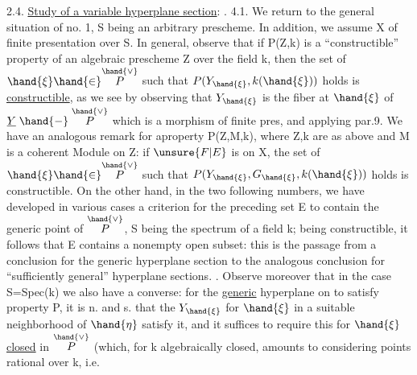 2.4. \uline{Study of a variable hyperplane section}: .
4.1.
We return to the general situation of no. 1, S being an arbitrary
prescheme. In addition, we assume X of finite presentation over S.
In general, observe that if P(Z,k) is a “constructible” property
 of an algebraic prescheme Z over the field k,
then the set of $\hand{\xi} \hand{\in} \overset{\hand{\vee}}{P}$ such that $P(Y_{\hand{\xi}},k(\hand{\xi}))$ holds is \uline{constructible},
as we see by observing that $Y_{\hand{\xi}}$ is the fiber at $\hand{\xi}$ of $\underline{Y} \mathrel{\hand{-}} \overset{\hand{\vee}}{P}$\hand{,} which
is a morphism of finite pres, and applying par.9. We have an
analogous remark for a\hand{|}property P(Z,M,k), where Z,k are as above
and M is a coherent Module on Z: if $\unsure{F|E}$ is  on X, the set
of $\hand{\xi} \hand{\in} \overset{\hand{\vee}}{P}$ such that $P(Y_{\hand{\xi}},G_{\hand{\xi}},k(\hand{\xi}))$ holds is constructible. On the other
hand, in the two following numbers, we have developed  in various
cases a criterion for the preceding set E to contain the generic
point of $\overset{\hand{\vee}}{P}$, S being the spectrum of a field k; being constructible,
it follows that E contains a nonempty open subset: this is the passage from a
conclusion for the generic hyperplane section to the analogous conclusion for “sufficiently general” hyperplane sections.  \hand{[}\hand{]}. Observe moreover that 
in the case S=Spec(k) we also have a converse: for the \uline{generic} hyperplane
on to satisfy property P, it is n. and s. that
the $Y_{\hand{\xi}}$ for $\hand{\xi}$ in a suitable neighborhood of $\hand{\eta}$ satisfy it, and it
suffices to require this for $\hand{\xi}$ \uline{closed} in $\overset{\hand{\vee}}{P}$ (which, for k algebraically
closed, amounts to considering points rational over k, i.e.


